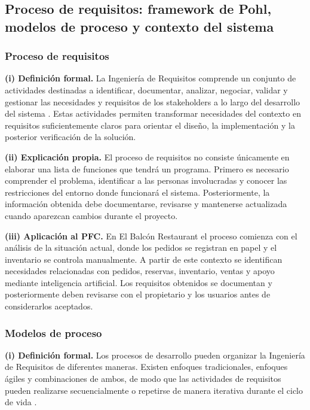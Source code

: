 \subsection{Proceso de requisitos: framework de Pohl, modelos de proceso y contexto del sistema}
\subsubsection{Proceso de requisitos}

\textbf{(i) Definición formal.}
La Ingeniería de Requisitos comprende un conjunto de actividades destinadas
a identificar, documentar, analizar, negociar, validar y gestionar las
necesidades y requisitos de los stakeholders a lo largo del desarrollo del
sistema \cite{ieee29148,pohl2025}. Estas actividades permiten transformar
necesidades del contexto en requisitos suficientemente claros para orientar
el diseño, la implementación y la posterior verificación de la solución.

\textbf{(ii) Explicación propia.}
El proceso de requisitos no consiste únicamente en elaborar una lista de
funciones que tendrá un programa. Primero es necesario comprender el problema,
identificar a las personas involucradas y conocer las restricciones del
entorno donde funcionará el sistema. Posteriormente, la información obtenida
debe documentarse, revisarse y mantenerse actualizada cuando aparezcan cambios
durante el proyecto.

\textbf{(iii) Aplicación al PFC.}
En El Balcón Restaurant el proceso comienza con el análisis de la situación
actual, donde los pedidos se registran en papel y el inventario se controla
manualmente. A partir de este contexto se identifican necesidades relacionadas
con pedidos, reservas, inventario, ventas y apoyo mediante inteligencia
artificial. Los requisitos obtenidos se documentan y posteriormente deben
revisarse con el propietario y los usuarios antes de considerarlos aceptados.

\subsubsection{Modelos de proceso}

\textbf{(i) Definición formal.}
Los procesos de desarrollo pueden organizar la Ingeniería de Requisitos de
diferentes maneras. Existen enfoques tradicionales, enfoques ágiles y
combinaciones de ambos, de modo que las actividades de requisitos pueden
realizarse secuencialmente o repetirse de manera iterativa durante el ciclo
de vida \cite{pohl2025,iso12207}.

